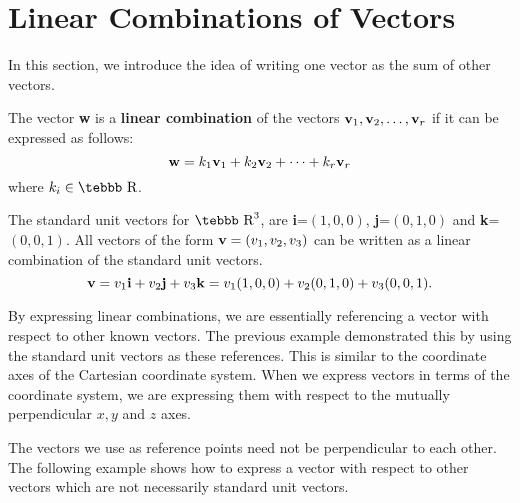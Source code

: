 \section{Linear Combinations of Vectors}
\label{ssec.lincomb}

In this section, we introduce the idea of writing one vector as
the sum of other vectors.

The vector {\bf w} is a {\bf linear combination} of the vectors
${\bf v}_1,{\bf v}_2, \ldots ,{\bf v}_r$ if it can be expressed as
follows: $${\bf w}=k_1{\bf v}_1+k_2{\bf v}_2+ \cdots + k_r{\bf
v}_r$$ where $k_i \in \mbox{\tebbb R}$.

\begin{example}
\label{exam5.standvec}

The standard unit vectors for $\mbox{\tebbb R}^3$, are {\bf
i}=$(1,0,0)$, {\bf j}=$(0,1,0)$ and {\bf k}=$(0,0,1)$.  All
vectors of the form ${\bf v}=(v_1,v_2,v_3)$ can be written as a
linear combination of the standard unit vectors. $${\bf v}=v_1{\bf
i}+v_2{\bf j}+v_3{\bf k}=v_1(1,0,0)+v_2(0,1,0)+v_3(0,0,1).$$
\end{example}

By expressing linear combinations, we are essentially referencing
a vector with respect to other known vectors.  The previous
example demonstrated this by using the standard unit vectors as
these references.  This is similar to the coordinate axes of the
Cartesian coordinate system.  When we express vectors in terms of
the coordinate system, we are expressing them with respect to the
mutually perpendicular $x,y$ and $z$ axes.

The vectors we use as reference points need not be perpendicular
to each other.  The following example shows how to express a
vector with respect to other vectors which are not necessarily
standard unit vectors.

